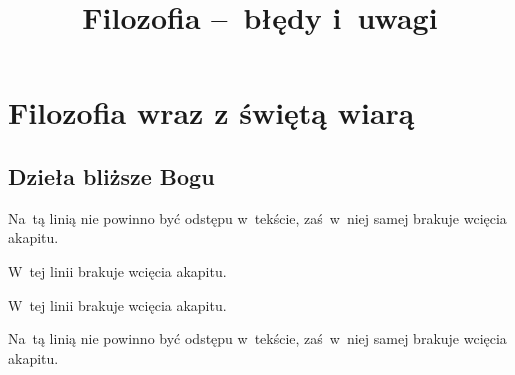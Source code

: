 \documentclass[a4paper,11pt]{article}
\title{Filozofia --~błędy i~uwagi}
\begin{document}





\maketitle  %





\section{Filozofia wraz z świętą wiarą}




\subsection{Dzieła bliższe Bogu}

\vspace{\spaceTwo}






\start {} Na~tą linią nie powinno być odstępu w~tekście,
zaś~w~niej samej brakuje wcięcia akapitu.

\vspace{\spaceFour}


\start {} W~tej linii brakuje wcięcia akapitu.

\vspace{\spaceFour}


\start {} W~tej linii brakuje wcięcia akapitu.

\vspace{\spaceFour}


\start {} Na~tą linią nie powinno być odstępu w~tekście,
zaś~w~niej samej brakuje wcięcia akapitu.
\end{document}
